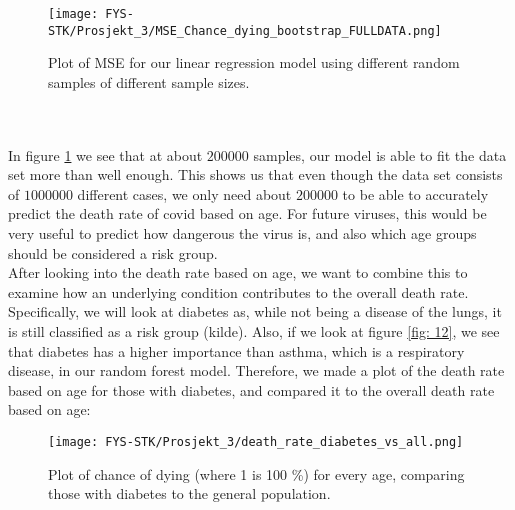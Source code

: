 \documentclass[english,notitlepage,reprint,nofootinbib]{revtex4-1}  %
\begin{document}
\begin{figure}[H]
    \centering
    \texttt{[image: FYS-STK/Prosjekt\_3/MSE\_Chance\_dying\_bootstrap\_FULLDATA.png]}
    \caption{Plot of MSE for our linear regression model using different random samples of different sample sizes.}
    \label{fig: 16}
\end{figure}
\\
\\
In figure \ref{fig: 16} we see that at about $200 000$ samples, our model is able to fit the data set more than well enough. This shows us that even though the data set consists of $1 000 000$ different cases, we only need about $200 000$ to be able to accurately predict the death rate of covid based on age. For future viruses, this would be very useful to predict how dangerous the virus is, and also which age groups should be considered a risk group.
\\
After looking into the death rate based on age, we want to combine this to examine how an underlying condition contributes to the overall death rate. Specifically, we will look at diabetes as, while not being a disease of the lungs, it is still classified as a risk group (kilde). Also, if we look at figure \ref{fig: 12}, we see that diabetes has a higher importance than asthma, which is a respiratory disease, in our random forest model. Therefore, we made a plot of the death rate based on age for those with diabetes, and compared it to the overall death rate based on age:
\begin{figure}[H]
    \centering
    \texttt{[image: FYS-STK/Prosjekt\_3/death\_rate\_diabetes\_vs\_all.png]}
    \caption{Plot of chance of dying (where 1 is 100 \%) for every age, comparing those with diabetes to the general population.}
    \label{fig: 17}
\end{figure}
\end{document}
